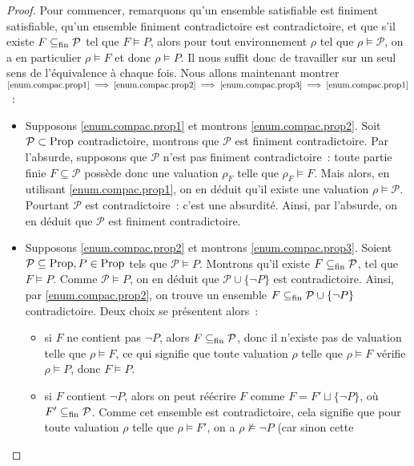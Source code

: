 \begin{proof}
  Pour commencer, remarquons qu'un ensemble satisfiable est finiment
  satisfiable, qu'un ensemble finiment contradictoire est contradictoire, et que
  s'il existe $F\subseteq_{\mathrm{fin}} \mathcal P$ tel que $F\vDash P$, alors pour tout
  environnement $\rho$ tel que $\rho\models \mathcal P$, on a en particulier
  $\rho\models F$ et donc $\rho\models P$. Il nous suffit donc de travailler sur
  un seul sens de l'équivalence à chaque fois. Nous allons maintenant montrer
  $\ref{enum.compac.prop1}\implies\ref{enum.compac.prop2}\implies
  \ref{enum.compac.prop3}\implies\ref{enum.compac.prop1}$~:
  \begin{itemize}
  \item Supposons \ref{enum.compac.prop1} et montrons \ref{enum.compac.prop2}.
    Soit $\mathcal P\subset \operatorname{Prop}$ contradictoire, montrons que $\mathcal P$
    est finiment contradictoire. Par l'absurde, supposons que $\mathcal P$ n'est
    pas finiment contradictoire~: toute partie finie $F\subseteq \mathcal P$
    possède donc une valuation $\rho_F$ telle que $\rho_F\models F$. Mais alors,
    en utilisant \ref{enum.compac.prop1}, on en déduit qu'il existe une
    valuation $\rho\models \mathcal P$. Pourtant $\mathcal P$ est
    contradictoire~: c'est une absurdité. Ainsi, par l'absurde, on en déduit que
    $\mathcal P$ est finiment contradictoire.
  \item Supposons \ref{enum.compac.prop2} et montrons \ref{enum.compac.prop3}.
    Soient $\mathcal P\subseteq\operatorname{Prop}, P\in\operatorname{Prop}$ tels que $\mathcal P\vDash P$.
    Montrons qu'il existe $F\subseteq_{\mathrm{fin}}\mathcal P$, tel que $F\vDash P$. Comme
    $\mathcal P\vDash P$, on en déduit que $\mathcal P \cup \{\lnot P\}$ est
    contradictoire. Ainsi, par \ref{enum.compac.prop2}, on trouve un ensemble
    $F\subseteq_{\mathrm{fin}} \mathcal P \cup \{\lnot P\}$ contradictoire. Deux choix se
    présentent alors~:
    \begin{itemize}
    \item si $F$ ne contient pas $\lnot P$, alors $F\subseteq_{\mathrm{fin}} \mathcal P$, donc
      il n'existe pas de valuation telle que $\rho\models F$, ce qui signifie
      que toute valuation $\rho$ telle que $\rho\models F$ vérifie
      $\rho\models P$, donc $F\vDash P$.
    \item si $F$ contient $\lnot P$, alors on peut réécrire $F$ comme
      $F = F'\sqcup\{\lnot P\}$, où $F'\subseteq_{\mathrm{fin}} \mathcal P$. Comme cet ensemble
      est contradictoire, cela signifie que pour toute valuation $\rho$ telle
      que $\rho\models F'$, on a $\rho\not\models \lnot P$ (car sinon cette

\end{itemize}
\end{itemize}
\end{proof}
